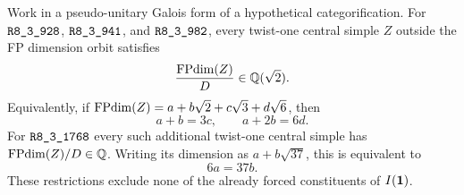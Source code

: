 \begin{proposition}
\label{prop:pointed-dimension-block}
Work in a pseudo-unitary Galois form of a hypothetical categorification.
For $\sha{R8_3_928}$, $\sha{R8_3_941}$, and $\sha{R8_3_982}$, every
twist-one central simple $Z$ outside the FP dimension orbit satisfies
\[
 \frac{\operatorname{FPdim}(Z)}{D}\in\mathbb Q(\sqrt2).
\]
Equivalently, if $\operatorname{FPdim}(Z)=a+b\sqrt2+c\sqrt3+d\sqrt6$, then
\begin{equation}\label{eq:pointed-quartic-dimension-mask}
 a+b=3c,\qquad a+2b=6d.
\end{equation}
For $\sha{R8_3_1768}$ every such additional twist-one central simple
has $\operatorname{FPdim}(Z)/D\in\mathbb Q$.  Writing its dimension as $a+b\sqrt{37}$,
this is equivalent to
\begin{equation}\label{eq:pointed-37-dimension-mask}
 6a=37b.
\end{equation}
These restrictions exclude none of the already forced constituents
of $I(\mathbf1)$.
\end{proposition}
